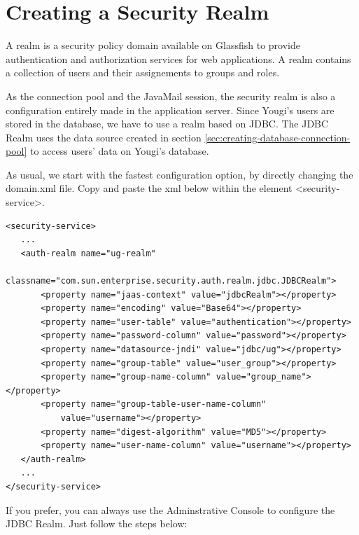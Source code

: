 \documentclass[envcountsame,envcountchap]{svmono}
\begin{document}
\section{Creating a Security Realm}

A realm is a security policy domain available on Glassfish to provide authentication and authorization services for web applications. A realm contains a collection of users and their assignements to groups and roles.

As the connection pool and the JavaMail session, the security realm is also a configuration entirely made in the application server. Since Yougi's users are stored in the database, we have to use a realm based on JDBC. The JDBC Realm uses the data source created in section \ref{sec:creating-database-connection-pool} to access users' data on Yougi's database.

As usual, we start with the fastest configuration option, by directly changing the domain.xml file. Copy and paste the xml below within the element \textless security-service\textgreater .

\begin{verbatim}
<security-service>
   ...
   <auth-realm name="ug-realm"
       classname="com.sun.enterprise.security.auth.realm.jdbc.JDBCRealm">
       <property name="jaas-context" value="jdbcRealm"></property>
       <property name="encoding" value="Base64"></property>
       <property name="user-table" value="authentication"></property>          
       <property name="password-column" value="password"></property>
       <property name="datasource-jndi" value="jdbc/ug"></property>
       <property name="group-table" value="user_group"></property>
       <property name="group-name-column" value="group_name"></property>
       <property name="group-table-user-name-column" 
           value="username"></property>
       <property name="digest-algorithm" value="MD5"></property>
       <property name="user-name-column" value="username"></property>
   </auth-realm>
   ...
</security-service>
\end{verbatim}

If you prefer, you can always use the Adminstrative Console to configure the JDBC Realm. Just follow the steps below:
\end{document}
